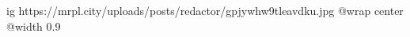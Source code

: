  
 
 
 
 

\ifcmt
  ig https://mrpl.city/uploads/posts/redactor/gpjywhw9tleavdku.jpg
  @wrap center
  @width 0.9
\fi

